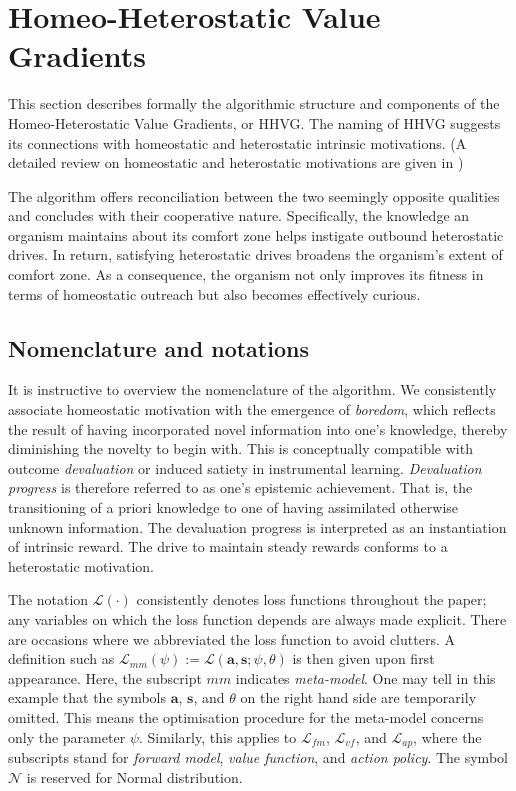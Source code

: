 \documentclass[utf8]{frontiersSCNS}
\newcommand{\bs}{\boldsymbol}
\begin{document}
\section{Homeo-Heterostatic Value Gradients} \label{sec:algorithm}

This section describes formally the algorithmic structure and components of the Homeo-Heterostatic Value Gradients, or HHVG. The naming of HHVG suggests its connections with homeostatic and heterostatic intrinsic motivations. (A detailed review on homeostatic and heterostatic motivations are given in \cite{intrinsicmotiv})

The algorithm offers reconciliation between the two seemingly opposite qualities and concludes with their cooperative nature. Specifically, the knowledge an organism maintains about its comfort zone helps instigate outbound heterostatic drives. In return, satisfying heterostatic drives broadens the organism's extent of comfort zone. As a consequence, the organism not only improves its fitness in terms of homeostatic outreach but also becomes effectively curious.

\subsection{Nomenclature and notations} \label{subsec:notation}

It is instructive to overview the nomenclature of the algorithm. We consistently associate homeostatic motivation with the emergence of {\it boredom}, which reflects the result of having incorporated novel information into one's knowledge, thereby diminishing the novelty to begin with. This is conceptually compatible with outcome {\it devaluation} or induced satiety in instrumental learning. {\it Devaluation progress} is therefore referred to as one's epistemic achievement. That is, the transitioning of a priori knowledge to one of having assimilated otherwise unknown information. The devaluation progress is interpreted as an instantiation of intrinsic reward. The drive to maintain steady rewards conforms to a heterostatic motivation.

The notation $\mathcal L(\cdot)$ consistently denotes loss functions throughout the paper; any variables on which the loss function depends are always made explicit. There are occasions where we abbreviated the loss function to avoid clutters. A definition such as $\mathcal L_{mm}(\psi) := \mathcal L(\bs a, \bs s; \psi, \theta)$ is then given upon first appearance. Here, the subscript $mm$ indicates {\it meta-model}. One may tell in this example that the symbols $\bs a$, $\bs s$, and $\theta$ on the right hand side are temporarily omitted. This means the optimisation procedure for the meta-model concerns only the parameter $\psi$. Similarly, this applies to $\mathcal L_{fm}$, $\mathcal L_{vf}$, and $\mathcal L_{ap}$, where the subscripts stand for {\it forward model}, {\it value function}, and {\it action policy}. The symbol $\mathcal N$ is reserved for Normal distribution. 
\end{document}
